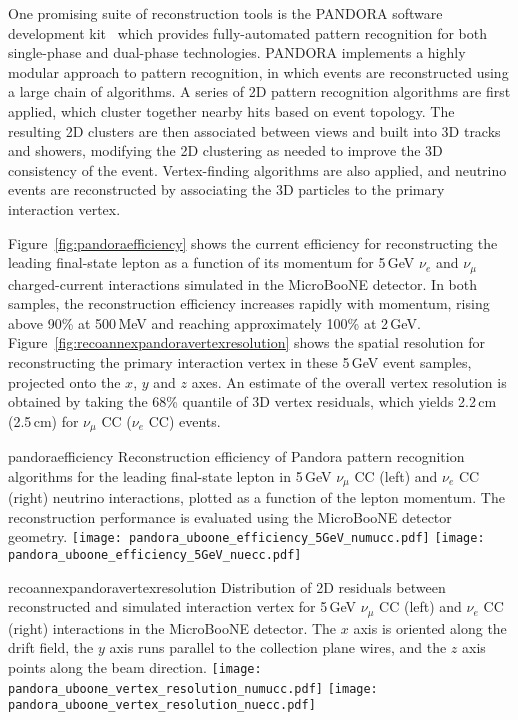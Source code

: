 One promising suite of reconstruction tools is the 
PANDORA software development kit~\cite{Marshall:2013bda,Marshall:2012hh}
which provides fully-automated pattern recognition for both single-phase 
and dual-phase technologies. 
PANDORA implements a highly modular approach to pattern recognition,
in which events are reconstructed using a large chain of algorithms. 
A series of 2D pattern recognition algorithms are first applied,
which cluster together nearby hits based on event topology.
The resulting 2D clusters are then associated between views
and built into 3D tracks and showers, modifying the 2D clustering 
as needed to improve the 3D consistency of the event. 
Vertex-finding algorithms are also applied,
and neutrino events are reconstructed by associating the 
3D particles to the primary interaction vertex.

Figure~\ref{fig:pandoraefficiency} shows the current efficiency for reconstructing
the leading final-state lepton as a function of its momentum
for 5\,GeV $\nu_{e}$ and $\nu_{\mu}$ charged-current interactions
simulated in the MicroBooNE detector.
In both samples, the reconstruction efficiency increases rapidly with momentum,
rising above 90\% at 500\,MeV and reaching approximately 100\% at 2\,GeV.
Figure~\ref{fig:recoannexpandoravertexresolution} shows the spatial resolution for
reconstructing the primary interaction vertex in these 5\,GeV event samples,
projected onto the $x$, $y$ and $z$ axes. An estimate of the overall vertex 
resolution is obtained by taking the 68\% quantile of 3D vertex residuals, 
which yields 2.2\,cm (2.5\,cm) for $\nu_{\mu}$ CC ($\nu_{e}$ CC) events.

\begin{cdrfigure}{pandoraefficiency}
{Reconstruction efficiency of Pandora pattern recognition algorithms
 for the leading final-state lepton in 5\,GeV $\nu_{\mu}$ CC (left) and
 $\nu_{e}$ CC (right) neutrino interactions, plotted as a function of
 the lepton momentum. The reconstruction performance is evaluated
 using the MicroBooNE detector geometry. }
\texttt{[image: pandora\_uboone\_efficiency\_5GeV\_numucc.pdf]}
\texttt{[image: pandora\_uboone\_efficiency\_5GeV\_nuecc.pdf]}
\end{cdrfigure}

\begin{cdrfigure}{recoannexpandoravertexresolution}
{Distribution of 2D residuals between reconstructed and simulated interaction
 vertex for 5\,GeV $\nu_{\mu}$ CC (left) and $\nu_{e}$ CC (right) interactions in the MicroBooNE detector.
 The $x$ axis is oriented along the drift field, the $y$ axis runs parallel 
 to the collection plane wires, and the $z$ axis points along the beam direction.}
\texttt{[image: pandora\_uboone\_vertex\_resolution\_numucc.pdf]}
\texttt{[image: pandora\_uboone\_vertex\_resolution\_nuecc.pdf]}
\end{cdrfigure}

